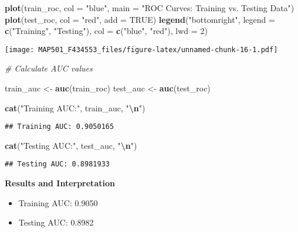 \documentclass[
]{article}
\newenvironment{Shaded}{\begin{snugshade}}{\end{snugshade}}
\newcommand{\AttributeTok}[1]{\textcolor[rgb]{0.13,0.29,0.53}{#1}}
\newcommand{\CommentTok}[1]{\textcolor[rgb]{0.56,0.35,0.01}{\textit{#1}}}
\newcommand{\ConstantTok}[1]{\textcolor[rgb]{0.56,0.35,0.01}{#1}}
\newcommand{\DecValTok}[1]{\textcolor[rgb]{0.00,0.00,0.81}{#1}}
\newcommand{\FunctionTok}[1]{\textcolor[rgb]{0.13,0.29,0.53}{\textbf{#1}}}
\newcommand{\NormalTok}[1]{#1}
\newcommand{\OtherTok}[1]{\textcolor[rgb]{0.56,0.35,0.01}{#1}}
\newcommand{\SpecialCharTok}[1]{\textcolor[rgb]{0.81,0.36,0.00}{\textbf{#1}}}
\newcommand{\StringTok}[1]{\textcolor[rgb]{0.31,0.60,0.02}{#1}}
\begin{document}
\begin{Shaded}
\begin{Highlighting}[]
\FunctionTok{plot}\NormalTok{(train\_roc, }\AttributeTok{col =} \StringTok{"blue"}\NormalTok{, }\AttributeTok{main =} \StringTok{"ROC Curves: Training vs. Testing Data"}\NormalTok{)}
\FunctionTok{plot}\NormalTok{(test\_roc, }\AttributeTok{col =} \StringTok{"red"}\NormalTok{, }\AttributeTok{add =} \ConstantTok{TRUE}\NormalTok{)}
\FunctionTok{legend}\NormalTok{(}\StringTok{"bottomright"}\NormalTok{, }\AttributeTok{legend =} \FunctionTok{c}\NormalTok{(}\StringTok{"Training"}\NormalTok{, }\StringTok{"Testing"}\NormalTok{), }\AttributeTok{col =} \FunctionTok{c}\NormalTok{(}\StringTok{"blue"}\NormalTok{, }\StringTok{"red"}\NormalTok{), }\AttributeTok{lwd =} \DecValTok{2}\NormalTok{)}
\end{Highlighting}
\end{Shaded}

\texttt{[image: MAP501\_F434553\_files/figure-latex/unnamed-chunk-16-1.pdf]}

\begin{Shaded}
\begin{Highlighting}[]
\CommentTok{\# Calculate AUC values}

\NormalTok{train\_auc }\OtherTok{\textless{}{-}} \FunctionTok{auc}\NormalTok{(train\_roc)}
\NormalTok{test\_auc }\OtherTok{\textless{}{-}} \FunctionTok{auc}\NormalTok{(test\_roc)}

\FunctionTok{cat}\NormalTok{(}\StringTok{"Training AUC:"}\NormalTok{, train\_auc, }\StringTok{"}\SpecialCharTok{\textbackslash{}n}\StringTok{"}\NormalTok{)}
\end{Highlighting}
\end{Shaded}

\begin{verbatim}
## Training AUC: 0.9050165
\end{verbatim}

\begin{Shaded}
\begin{Highlighting}[]
\FunctionTok{cat}\NormalTok{(}\StringTok{"Testing AUC:"}\NormalTok{, test\_auc, }\StringTok{"}\SpecialCharTok{\textbackslash{}n}\StringTok{"}\NormalTok{)}
\end{Highlighting}
\end{Shaded}

\begin{verbatim}
## Testing AUC: 0.8981933
\end{verbatim}

\textbf{Results and Interpretation}

\begin{itemize}
\item
  Training AUC: 0.9050
\item
  Testing AUC: 0.8982
\end{itemize}
\end{document}
